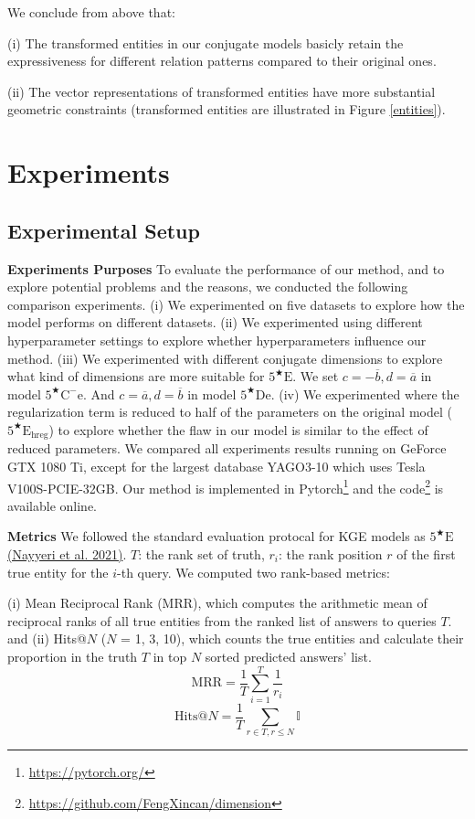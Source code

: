 \documentclass[11pt]{article}
\begin{document}
We conclude from above that: 

(i) The transformed entities in our conjugate models basicly retain the expressiveness for different relation patterns compared to their original ones.

(ii) The vector representations of transformed entities have more substantial geometric constraints (transformed entities are illustrated in Figure \ref{entities}).

\section{Experiments}
\subsection{Experimental Setup}
\textbf{Experiments Purposes}
To evaluate the performance of our method, and to explore potential problems and the reasons, we conducted the following comparison experiments.
(i) We experimented on five datasets to explore how the model performs on different datasets.
(ii) We experimented using different hyperparameter settings to explore whether hyperparameters influence our method.
(iii) We experimented with different conjugate dimensions to explore what kind of dimensions are more suitable for $5^{\bigstar}\mathrm{E}$. 
We set $c = -\overline{b}, d = \overline{a}$ in model $5^{\bigstar}\mathrm{C^{-}e}$.
And $c = \overline{a}, d = \overline{b}$ in model $5^{\bigstar}\mathrm{De}$.
(iv) We experimented where the regularization term is reduced to half of the parameters on the original model ($5^{\bigstar}\mathrm{E_{hreg}}$) to explore whether the flaw in our model is similar to the effect of reduced parameters.
We compared all experiments results running on GeForce GTX 1080 Ti,
except for the largest database YAGO3-10 which uses Tesla V100S-PCIE-32GB.
Our method is implemented in Pytorch\footnote{\url{https://pytorch.org/}} and the code\footnote{\url{https://github.com/FengXincan/dimension}} is available online.

\textbf{Metrics} 
We followed the standard evaluation protocal for KGE models as $5^{\bigstar}\mathrm{E}$
\hyperlink{Nay21}{(Nayyeri et al. 2021)}.
$T$: the rank set of truth, 
$r_i$: the rank position $r$ of the first true entity for the $i$-th query.
We computed two rank-based metrics:

(i) Mean Reciprocal Rank (MRR), which computes the arithmetic mean of reciprocal ranks of all true entities from the ranked list of answers to queries $T$.
and (ii) Hits@$N$ ($N$ = 1, 3, 10), which counts the true entities and calculate their proportion in the truth $T$ in top $N$ sorted predicted answers' list.
\[\mathrm{MRR}=\frac{1}{T}\sum_{i=1}^{T}\frac{1}{r_i}\]
\[\mathrm{Hits@}N=\frac{1}{T}\sum_{r\in T, r\leq N} \mathbb{I}\]
\end{document}
